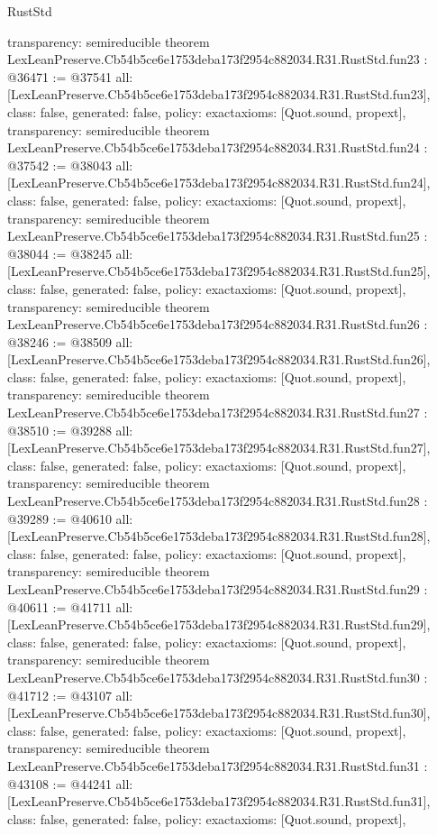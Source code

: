 \begin{lexlean}{RustStd}
\begin{coremodule}
{  transparency: semireducible
}
theorem LexLeanPreserve.Cb54b5ce6e1753deba173f2954c882034.R31.RustStd.fun23 : @36471 := @37541 {
  all: [LexLeanPreserve.Cb54b5ce6e1753deba173f2954c882034.R31.RustStd.fun23],
  class: false,
  generated: false,
  policy: exact{axioms: [Quot.sound, propext]},
  transparency: semireducible
}
theorem LexLeanPreserve.Cb54b5ce6e1753deba173f2954c882034.R31.RustStd.fun24 : @37542 := @38043 {
  all: [LexLeanPreserve.Cb54b5ce6e1753deba173f2954c882034.R31.RustStd.fun24],
  class: false,
  generated: false,
  policy: exact{axioms: [Quot.sound, propext]},
  transparency: semireducible
}
theorem LexLeanPreserve.Cb54b5ce6e1753deba173f2954c882034.R31.RustStd.fun25 : @38044 := @38245 {
  all: [LexLeanPreserve.Cb54b5ce6e1753deba173f2954c882034.R31.RustStd.fun25],
  class: false,
  generated: false,
  policy: exact{axioms: [Quot.sound, propext]},
  transparency: semireducible
}
theorem LexLeanPreserve.Cb54b5ce6e1753deba173f2954c882034.R31.RustStd.fun26 : @38246 := @38509 {
  all: [LexLeanPreserve.Cb54b5ce6e1753deba173f2954c882034.R31.RustStd.fun26],
  class: false,
  generated: false,
  policy: exact{axioms: [Quot.sound, propext]},
  transparency: semireducible
}
theorem LexLeanPreserve.Cb54b5ce6e1753deba173f2954c882034.R31.RustStd.fun27 : @38510 := @39288 {
  all: [LexLeanPreserve.Cb54b5ce6e1753deba173f2954c882034.R31.RustStd.fun27],
  class: false,
  generated: false,
  policy: exact{axioms: [Quot.sound, propext]},
  transparency: semireducible
}
theorem LexLeanPreserve.Cb54b5ce6e1753deba173f2954c882034.R31.RustStd.fun28 : @39289 := @40610 {
  all: [LexLeanPreserve.Cb54b5ce6e1753deba173f2954c882034.R31.RustStd.fun28],
  class: false,
  generated: false,
  policy: exact{axioms: [Quot.sound, propext]},
  transparency: semireducible
}
theorem LexLeanPreserve.Cb54b5ce6e1753deba173f2954c882034.R31.RustStd.fun29 : @40611 := @41711 {
  all: [LexLeanPreserve.Cb54b5ce6e1753deba173f2954c882034.R31.RustStd.fun29],
  class: false,
  generated: false,
  policy: exact{axioms: [Quot.sound, propext]},
  transparency: semireducible
}
theorem LexLeanPreserve.Cb54b5ce6e1753deba173f2954c882034.R31.RustStd.fun30 : @41712 := @43107 {
  all: [LexLeanPreserve.Cb54b5ce6e1753deba173f2954c882034.R31.RustStd.fun30],
  class: false,
  generated: false,
  policy: exact{axioms: [Quot.sound, propext]},
  transparency: semireducible
}
theorem LexLeanPreserve.Cb54b5ce6e1753deba173f2954c882034.R31.RustStd.fun31 : @43108 := @44241 {
  all: [LexLeanPreserve.Cb54b5ce6e1753deba173f2954c882034.R31.RustStd.fun31],
  class: false,
  generated: false,
  policy: exact{axioms: [Quot.sound, propext]},
}
\end{coremodule}
\end{lexlean}

